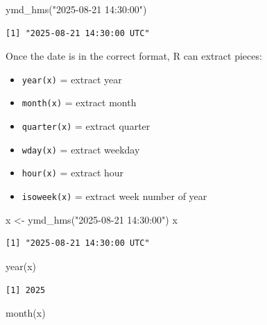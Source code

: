 \documentclass[
  letterpaper,
  DIV=11,
  numbers=noendperiod]{scrreprt}
\newenvironment{Shaded}{\begin{snugshade}}{\end{snugshade}}
\newcommand{\FunctionTok}[1]{\textcolor[rgb]{0.28,0.35,0.67}{#1}}
\newcommand{\NormalTok}[1]{\textcolor[rgb]{0.00,0.23,0.31}{#1}}
\newcommand{\OtherTok}[1]{\textcolor[rgb]{0.00,0.23,0.31}{#1}}
\newcommand{\StringTok}[1]{\textcolor[rgb]{0.13,0.47,0.30}{#1}}
\providecommand{\tightlist}{%
  \setlength{\itemsep}{0pt}\setlength{\parskip}{0pt}}
\begin{document}
\begin{Shaded}
\begin{Highlighting}[]
\FunctionTok{ymd\_hms}\NormalTok{(}\StringTok{"2025{-}08{-}21 14:30:00"}\NormalTok{)}
\end{Highlighting}
\end{Shaded}

\begin{verbatim}
[1] "2025-08-21 14:30:00 UTC"
\end{verbatim}

Once the date is in the correct format, R can extract pieces:

\begin{itemize}
\tightlist
\item
  \texttt{year(x)} = extract year
\item
  \texttt{month(x)} = extract month
\item
  \texttt{quarter(x)} = extract quarter
\item
  \texttt{wday(x)} = extract weekday
\item
  \texttt{hour(x)} = extract hour
\item
  \texttt{isoweek(x)} = extract week number of year
\end{itemize}

\begin{Shaded}
\begin{Highlighting}[]
\NormalTok{x }\OtherTok{\textless{}{-}} \FunctionTok{ymd\_hms}\NormalTok{(}\StringTok{"2025{-}08{-}21 14:30:00"}\NormalTok{)}
\NormalTok{x}
\end{Highlighting}
\end{Shaded}

\begin{verbatim}
[1] "2025-08-21 14:30:00 UTC"
\end{verbatim}

\begin{Shaded}
\begin{Highlighting}[]
\FunctionTok{year}\NormalTok{(x)}
\end{Highlighting}
\end{Shaded}

\begin{verbatim}
[1] 2025
\end{verbatim}

\begin{Shaded}
\begin{Highlighting}[]
\FunctionTok{month}\NormalTok{(x)}
\end{Highlighting}
\end{Shaded}
\end{document}
